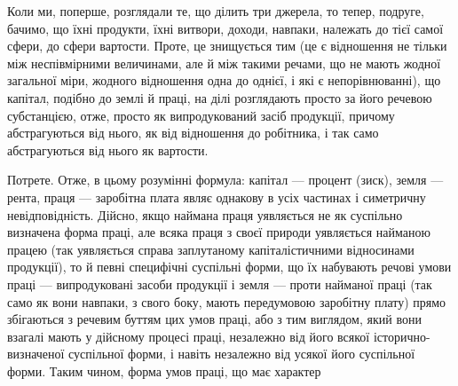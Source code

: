 Коли ми, поперше, розглядали те, що ділить три джерела, то тепер, подруге,
бачимо, що їхні продукти, їхні витвори, доходи, навпаки, належать до тієї
самої сфери, до сфери вартости. Проте, це знищується тим (це є відношення
не тільки між неспівмірними величинами, але й між такими речами, що не
мають жодної загальної міри, жодного відношення одна до однієї, і які є непорівнюванні),
що капітал, подібно до землі й праці, на ділі розглядають просто за
його речевою субстанцією, отже, просто як випродукований засіб продукції,
причому абстрагуються від нього, як від відношення до робітника, і так само
абстрагуються від нього як вартости.

Потрете. Отже, в цьому розумінні формула: капітал — процент (зиск), земля
— рента, праця — заробітна плата являє однакову в усіх частинах і симетричну
невідповідність. Дійсно, якщо наймана праця уявляється не як суспільно
визначена форма праці, але всяка праця з своєї природи уявляється найманою
працею (так уявляється справа заплутаному капіталістичними відносинами
продукції), то й певні специфічні суспільні форми, що їх набувають речові умови
праці — випродуковані засоби продукції і земля — проти найманої праці
(так само як вони навпаки, з свого боку, мають передумовою заробітну
плату) прямо збігаються з речевим буттям цих умов праці, або з тим
виглядом, який вони взагалі мають у дійсному процесі праці, незалежно
від його всякої історично-визначеної суспільної форми, і навіть незалежно від
усякої його суспільної форми. Таким чином, форма умов праці, що має характер
\parbreak{}  %
